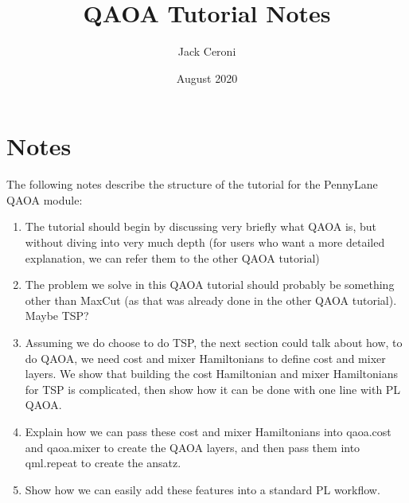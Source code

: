 \documentclass[10pt, oneside]{article}
\title{QAOA Tutorial Notes}
\author{Jack Ceroni}
\date{August 2020}
\begin{document}
\maketitle
\tableofcontents

\vspace{.25in}

\section{Notes}

The following notes describe the structure of the tutorial for the PennyLane QAOA module:

\begin{enumerate}
	\item The tutorial should begin by discussing very briefly what QAOA is, but without diving into very much depth 
		(for users who want a more detailed explanation, we can refer them to the other QAOA tutorial)
	\item The problem we solve in this QAOA tutorial should probably be something other than MaxCut (as that was already done 
		in the other QAOA tutorial). Maybe TSP?
	\item Assuming we do choose to do TSP, the next section could talk about how, to do QAOA, we need cost and mixer Hamiltonians 
		to define cost and mixer layers. We show that building the cost Hamiltonian and mixer Hamiltonians for TSP is complicated, then show how it 
		can be done with one line with PL QAOA.
	\item Explain how we can pass these cost and mixer Hamiltonians into qaoa.cost and qaoa.mixer to create the QAOA layers, and then 
		pass them into qml.repeat to create the ansatz.
	\item Show how we can easily add these features into a standard PL workflow.
	

	
\end{enumerate}
\end{document}
